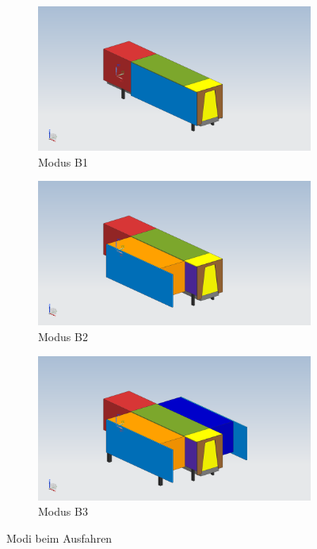 \begin{figure}[!ht]
  \centering
    \begin{subfigure}{.333\textwidth}
      \centering
      \includegraphics[width=.98\linewidth]{04_figures/B1.png}
      \caption{Modus B1}
      \label{Modus B1}
    \end{subfigure}%
    \begin{subfigure}{.333\textwidth}
      \centering
      \includegraphics[width=.98\linewidth]{04_figures/B2.png}
      \caption{Modus B2}
      \label{Modus B2}
    \end{subfigure}%
    \begin{subfigure}{.333\textwidth}
      \centering
      \includegraphics[width=.98\linewidth]{04_figures/B3.png}
      \caption{Modus B3}
      \label{Modus B3}
    \end{subfigure}
  \caption{Modi beim Ausfahren}
\label{Modi beim Ausfahren}
\end{figure}

